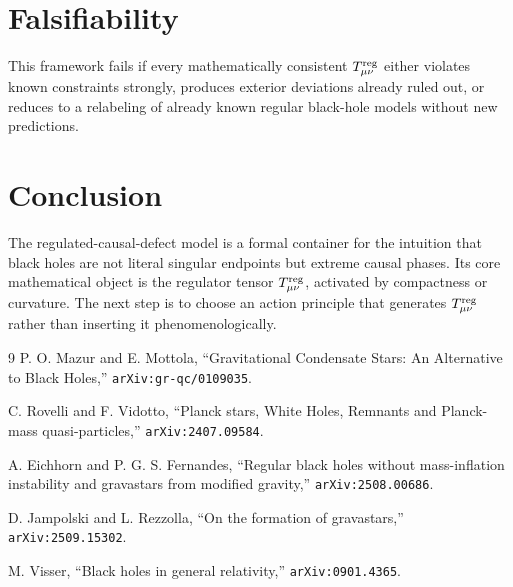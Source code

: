 \documentclass[11pt]{article}
\theoremstyle{remark}
\begin{document}
\section{Falsifiability}
This framework fails if every mathematically consistent $T^{\rm reg}_{\mu\nu}$ either violates known constraints strongly, produces exterior deviations already ruled out, or reduces to a relabeling of already known regular black-hole models without new predictions.

\section{Conclusion}
The regulated-causal-defect model is a formal container for the intuition that black holes are not literal singular endpoints but extreme causal phases. Its core mathematical object is the regulator tensor $T^{\rm reg}_{\mu\nu}$, activated by compactness or curvature. The next step is to choose an action principle that generates $T^{\rm reg}_{\mu\nu}$ rather than inserting it phenomenologically.

\begin{thebibliography}{9}
P. O. Mazur and E. Mottola,
``Gravitational Condensate Stars: An Alternative to Black Holes,''
\texttt{arXiv:gr-qc/0109035}.

C. Rovelli and F. Vidotto,
``Planck stars, White Holes, Remnants and Planck-mass quasi-particles,''
\texttt{arXiv:2407.09584}.

A. Eichhorn and P. G. S. Fernandes,
``Regular black holes without mass-inflation instability and gravastars from modified gravity,''
\texttt{arXiv:2508.00686}.

D. Jampolski and L. Rezzolla,
``On the formation of gravastars,''
\texttt{arXiv:2509.15302}.

M. Visser,
``Black holes in general relativity,''
\texttt{arXiv:0901.4365}.
\end{thebibliography}
\end{document}

